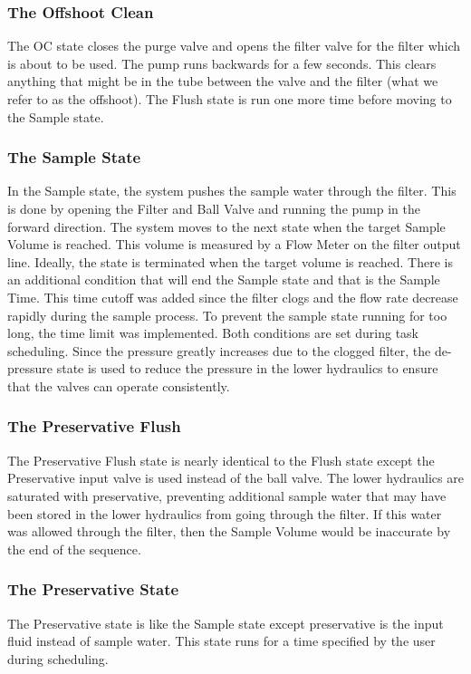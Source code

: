 \documentclass[11pt, letterpaper]{article}
\begin{document}
\subsubsection{The Offshoot Clean}
The OC state closes the purge valve and opens the filter valve for the filter which is about to be used. The pump runs backwards for a few seconds. This clears anything that might be in the tube between the valve and the filter (what we refer to as the offshoot). The Flush state is run one more time before moving to the Sample state.

\subsubsection{The Sample State} 
In the Sample state, the system pushes the sample water through the filter. This is done by opening the Filter and Ball Valve and running the pump in the forward direction. The system moves to the next state when the target Sample Volume is reached. This volume is measured by a Flow Meter on the filter output line. Ideally, the state is terminated when the target volume is reached. There is an additional condition that will end the Sample state and that is the Sample Time. This time cutoff was added since the filter clogs and the flow rate decrease rapidly during the sample process. To prevent the sample state running for too long, the time limit was implemented. Both conditions are set during task scheduling. Since the pressure greatly increases due to the clogged filter, the de-pressure state is used to reduce the pressure in the lower hydraulics to ensure that the valves can operate consistently.

\subsubsection{The Preservative Flush} %
The Preservative Flush state is nearly identical to the Flush state except the Preservative input valve is used instead of the ball valve. The lower hydraulics are saturated with preservative, preventing additional sample water that may have been stored in the lower hydraulics from going through the filter. If this water was allowed through the filter, then the Sample Volume would be inaccurate by the end of the sequence.

\subsubsection{The Preservative State} %
The Preservative state is like the Sample state except preservative is the input fluid instead of sample water. This state runs for a time specified by the user during scheduling.
\end{document}
